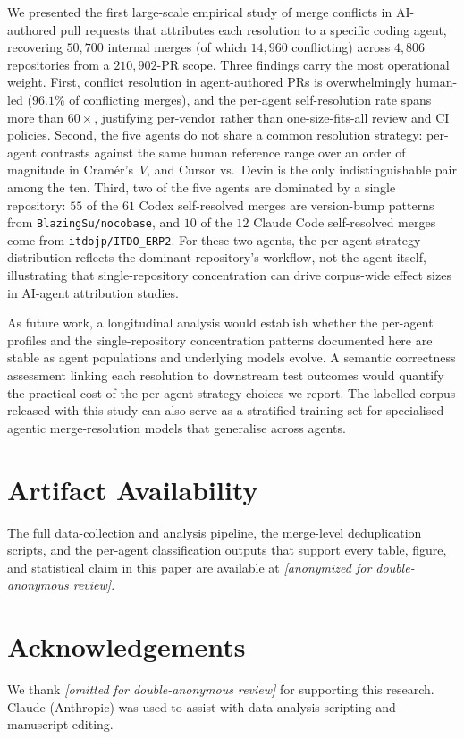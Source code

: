 \documentclass[sigconf,anonymous]{acmart}
\begin{document}
We presented the first large-scale empirical study of merge conflicts in AI-authored pull requests that attributes each resolution to a specific coding agent, recovering $50{,}700$ internal merges (of which $14{,}960$ conflicting) across $4{,}806$ repositories from a $210{,}902$-PR scope. Three findings carry the most operational weight. First, conflict resolution in agent-authored PRs is overwhelmingly human-led ($96.1\%$ of conflicting merges), and the per-agent self-resolution rate spans more than $60{\times}$, justifying per-vendor rather than one-size-fits-all review and CI policies. Second, the five agents do not share a common resolution strategy: per-agent contrasts against the same human reference range over an order of magnitude in Cram\'{e}r's~$V$, and Cursor vs.\ Devin is the only indistinguishable pair among the ten. Third, two of the five agents are dominated by a single repository: $55$ of the $61$ Codex self-resolved merges are version-bump patterns from \texttt{BlazingSu/nocobase}, and $10$ of the $12$ Claude Code self-resolved merges come from \texttt{itdojp/ITDO\_ERP2}. For these two agents, the per-agent strategy distribution reflects the dominant repository's workflow, not the agent itself, illustrating that single-repository concentration can drive corpus-wide effect sizes in AI-agent attribution studies.


As future work, a longitudinal analysis would establish whether the per-agent profiles and the single-repository concentration patterns documented here are stable as agent populations and underlying models evolve. A semantic correctness assessment linking each resolution to downstream test outcomes would quantify the practical cost of the per-agent strategy choices we report. The labelled corpus released with this study can also serve as a stratified training set for specialised agentic merge-resolution models that generalise across agents.

\section*{Artifact Availability}
The full data-collection and analysis pipeline, the merge-level deduplication scripts, and the per-agent classification outputs that support every table, figure, and statistical claim in this paper are available at \emph{[anonymized for double-anonymous review]}.

\section*{Acknowledgements}
We thank \emph{[omitted for double-anonymous review]} for supporting this research. Claude (Anthropic) was used to assist with data-analysis scripting and manuscript editing.



\end{document}
